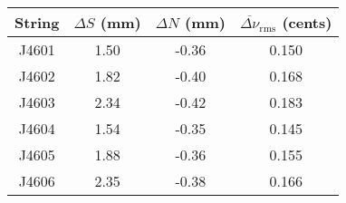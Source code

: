 \begin{tabular}{cccc}
\toprule
String & $\Delta S$ (mm) & $\Delta N$ (mm) & $\overline{\Delta \nu}_\text{rms}$ (cents) \\
\midrule
J4601 & 1.50 & -0.36 & 0.150 \\
J4602 & 1.82 & -0.40 & 0.168 \\
J4603 & 2.34 & -0.42 & 0.183 \\
J4604 & 1.54 & -0.35 & 0.145 \\
J4605 & 1.88 & -0.36 & 0.155 \\
J4606 & 2.35 & -0.38 & 0.166 \\
\bottomrule
\end{tabular}
